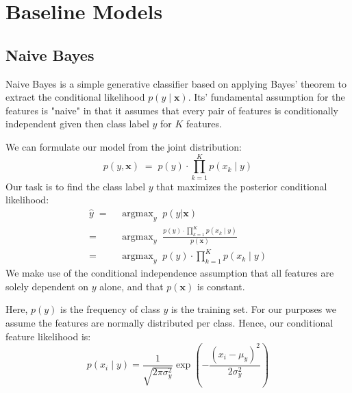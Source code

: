\documentclass{article}
\DeclareMathOperator*{\argmax}{argmax}
\begin{document}

\section{Baseline Models}
\label{sec:baseline-models}
\subsection{Naive Bayes}
\label{sec:NB}
Naive Bayes is a simple generative classifier based on applying Bayes' theorem
to extract the conditional likelihood $p(y \mid \mathbf{x})$. Its' fundamental
assumption for the features is "naive" in that it assumes that every pair of
features is conditionally independent given then class label $y$ for $K$ features.

We can formulate our model from the joint distribution:
\begin{equation}
    p(y, \mathbf{x}) \; = \; p(y) \cdot \prod_{k=1}^K p(x_k \mid y)
\end{equation}
Our task is to find the class label $y$ that maximizes the posterior conditional
likelihood:
\begin{equation}
  \begin{aligned}
    \hat{y} \; = \; & \argmax_y \; p(y | \mathbf{x}) \\
    = \; & \argmax_y \; \frac{p(y) \cdot \prod_{k=1}^K p(x_k \mid y)}{p(\mathbf{x})} \\
    = \; & \argmax_y \; p(y) \cdot \prod_{k=1}^K p(x_k \mid y)
  \end{aligned}
\end{equation}
We make use of the conditional independence assumption that all features
are solely dependent on $y$ alone, and that $p(\mathbf{x})$ is constant.

Here, $p(y)$ is the frequency of class $y$ is the training set.
For our purposes we assume the features are normally distributed per class.
Hence, our conditional feature likelihood is:
\begin{equation}
  p(x_i \mid y) = \frac{1}{\sqrt{2\pi\sigma^2_y}} \exp\left(-\frac{(x_i - \mu_y)^2}{2\sigma^2_y}\right)
\end{equation}
\end{document}
